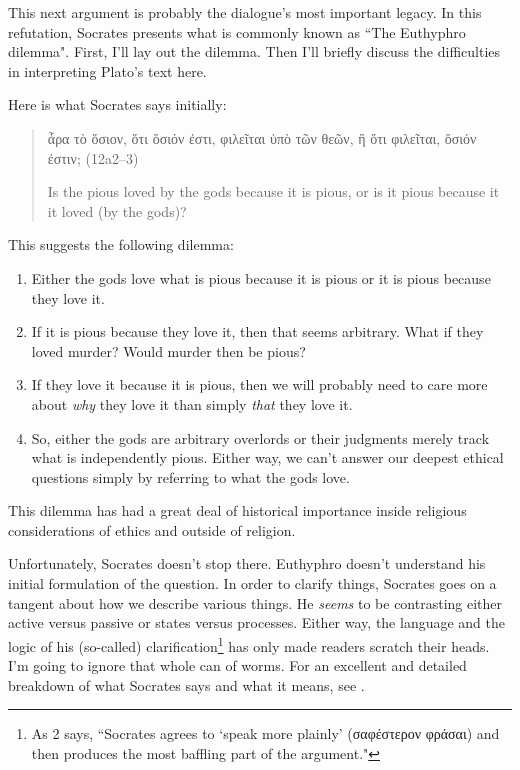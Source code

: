 \documentclass[11pt]{article}
\begin{document}
This next argument is probably the dialogue's most important legacy.  In this refutation, Socrates presents what is commonly known as ``The Euthyphro dilemma".  First, I'll lay out the dilemma.  Then I'll briefly discuss the difficulties in interpreting Plato's text here.

Here is what Socrates says initially:

\begin{quote}
    ἆρα τὸ ὅσιον, ὅτι ὅσιόν ἐστι, φιλεῖται ὑπὸ τῶν θεῶν, ἢ ὅτι φιλεῖται, ὅσιόν ἐστιν; (12a2--3)

    Is the pious loved by the gods because it is pious, or is it pious because it it loved (by the gods)?
\end{quote}

This suggests the following dilemma:

\begin{enumerate}
    \item Either the gods love what is pious because it is pious or it is pious because they love it.
    \item If it is pious because they love it, then that seems arbitrary.  What if they loved murder?  Would murder then be pious?
    \item If they love it because it is pious, then we will probably need to care more about \emph{why} they love it than simply \emph{that} they love it.
    \item So, either the gods are arbitrary overlords or their judgments merely track what is independently pious.  Either way, we can't answer our deepest ethical questions simply by referring to what the gods love.
\end{enumerate}

This dilemma has had a great deal of historical importance inside religious considerations of ethics and outside of religion.

Unfortunately, Socrates doesn't stop there.  Euthyphro doesn't understand his initial formulation of the question.  In order to clarify things, Socrates goes on a tangent about how we describe various things.  He \emph{seems} to be contrasting either active versus passive or states versus processes.  Either way, the language and the logic of his (so-called) clarification\footnote{As \cite{cohen1971} 2 says, ``Socrates agrees to `speak more plainly' (σαφέστερον φράσαι) and then produces the most baffling part of the argument."} has only made readers scratch their heads.  I'm going to ignore that whole can of worms.  For an excellent and detailed breakdown of what Socrates says and what it means, see \citet{cohen1971}.
\end{document}
